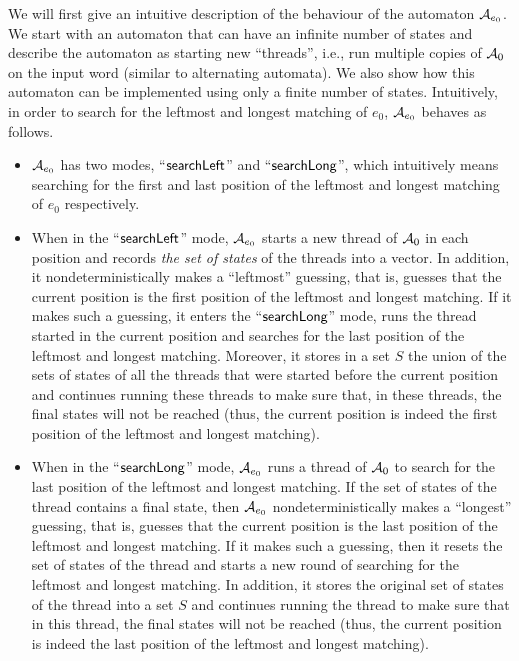 %
We will first give an intuitive description of the behaviour of the automaton $\mathcal{A}_{e_0}$.
We start with an automaton that can have an infinite number of states and describe the automaton as starting new ``threads'', i.e., run multiple copies of $\mathcal{A}_0$ on the input word (similar to alternating automata).
We also show how this automaton can be implemented using only a finite number of states.
Intuitively, in order to search for the leftmost and longest matching of $e_0$, $\mathcal{A}_{e_0}$ behaves as follows.
\begin{itemize}
\item $\mathcal{A}_{e_0}$ has two modes, ``$\mathsf{searchLeft}$'' and ``$\mathsf{searchLong}$'', which intuitively means searching  for the first and last position of the leftmost and longest matching of $e_0$ respectively.
	\item When in the ``$\mathsf{searchLeft}$'' mode, $\mathcal{A}_{e_0}$ starts a new thread of $\mathcal{A}_0$ in each position and records \emph{the set of states} of the threads into a vector. 
    In addition, it nondeterministically makes a ``leftmost'' guessing, that is, guesses that the current position is the first position of the leftmost and longest matching. 
    If it makes such a guessing, it enters the ``$\mathsf{searchLong}$'' mode, runs the thread started in the current position and searches for the last position of the leftmost and longest matching. 
    Moreover, it stores in a set $S$ the union of the sets of states of all the threads that were started before the current position and continues running these threads to make sure that, in these threads, the final states will not be reached (thus, the current position is indeed the first position of the leftmost and longest matching).
	\item When in the ``$\mathsf{searchLong}$'' mode, $\mathcal{A}_{e_0}$ runs a thread of $\mathcal{A}_{0}$ to search for the last position of the leftmost and longest matching. 
    If the set of states of the thread contains a final state, then $\mathcal{A}_{e_0}$ nondeterministically makes a ``longest'' guessing, that is, guesses that the current position is the last position of the leftmost and longest matching. 
    If it makes such a guessing, then it resets the set of states of the thread and starts a new round of searching for the leftmost and longest matching. 
    In addition, it stores the original set of states of the thread into a set $S$ and continues running the thread to make sure that in this thread, the final states  will not be reached (thus, the current position is indeed the last position of the leftmost and longest matching).

\end{itemize}
